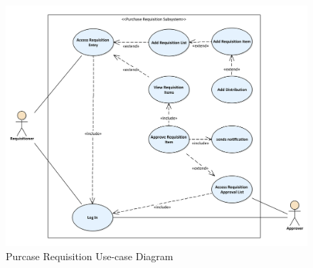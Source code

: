\documentclass[12pt]{report} %
\begin{document}
\begin{figure}[h]
	\begin{center}
	\includegraphics[width=1\textwidth]{pic/usecase/seupr_usecase_requisitioner.png}
	\end{center}
	\caption{Purcase Requisition Use-case Diagram}
	\label{fig:seupr_usecase_requisitioner}
\end{figure}
\clearpage
\end{document}
